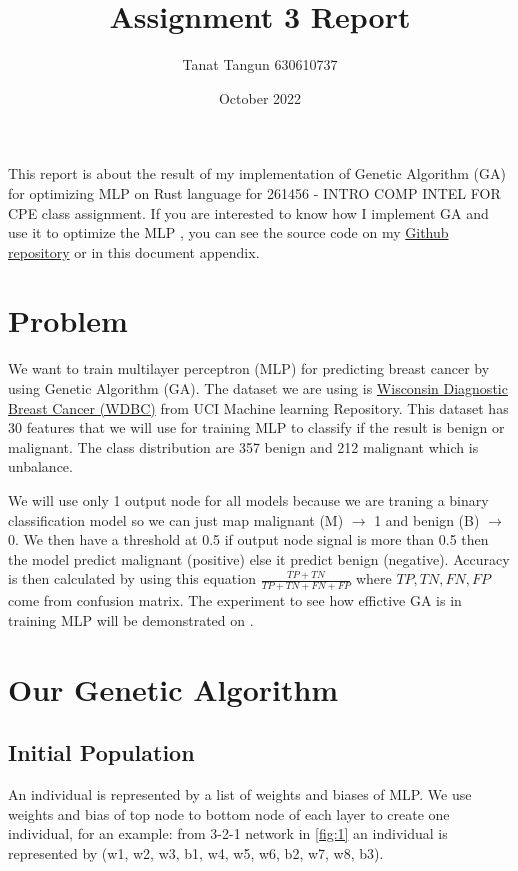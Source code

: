 \documentclass{article}
\title{
Assignment 3 Report
}
\author{Tanat Tangun 630610737}
\date{October 2022}
\begin{document}
\maketitle
This report is about the result of my implementation of Genetic Algorithm (GA) for optimizing MLP on 
Rust language for 261456 - INTRO COMP INTEL FOR CPE class
assignment.
If you are interested to know how I implement GA and use it to optimize the MLP
, you can see the source code on my 
\href{https://github.com/RiwEZ/MLPOnRust}{Github repository} or in this document appendix.

\section*{Problem}
We want to train multilayer perceptron (MLP) for predicting breast cancer by using Genetic Algorithm (GA). The dataset we are using 
is \href{https://archive.ics.uci.edu/ml/datasets/Breast+Cancer+Wisconsin+%28Diagnostic%29}{Wisconsin Diagnostic Breast Cancer (WDBC)} 
from UCI Machine learning Repository. This dataset has 30 features that we will use for training MLP to classify if the result is 
benign or malignant. The class distribution are 357 benign and 212 malignant which is unbalance. 

We will use only 1 output node for all models because we are traning a binary classification model so we can just map
malignant (M) $\rightarrow$ 1 and benign (B) $\rightarrow$ 0. We then have a threshold at 0.5 if output node signal is more than 0.5 then
the model predict malignant (positive) else it predict benign (negative). 
Accuracy is then calculated by using this equation $\frac{TP+TN}{TP+TN+FN+FP}$ where $TP, TN, FN, FP$ come from confusion matrix. 
The experiment to see how effictive GA is in training MLP will be demonstrated on . 


\section*{Our Genetic Algorithm}
\subsection*{Initial Population}\label{init}
An individual is represented by a list of weights and biases of MLP. 
We use weights and bias of top node to bottom node of each layer to create one individual, 
for an example: from 3-2-1 network in \cref*{fig:1} an individual is represented by (w1, w2, w3, b1, w4, w5, w6, b2, w7, w8, b3).
\end{document}
